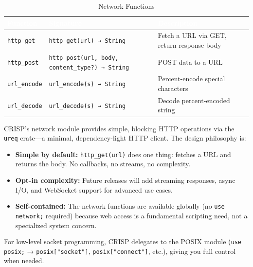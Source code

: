 \begin{table}[H]
\centering
{}
\caption{\textcolor{darkpurple}{Network Functions}}
\vspace{0.3em}
\begin{tabular}{@{}llp{8cm}@{}}
\toprule
\rowcolor{softvioletdark}
\textbf{\textcolor{white}{Function}} & \textbf{\textcolor{white}{Signature}} & \textbf{\textcolor{white}{Description}} \\
\midrule
\texttt{http\_get} & \texttt{http\_get(url) → String} & Fetch a URL via GET, return response body \\
\texttt{http\_post} & \texttt{http\_post(url, body, content\_type?) → String} & POST data to a URL \\
\texttt{url\_encode} & \texttt{url\_encode(s) → String} & Percent-encode special characters \\
\texttt{url\_decode} & \texttt{url\_decode(s) → String} & Decode percent-encoded string \\
\bottomrule
\end{tabular}
\end{table}

\vspace{1.5cm}
\begin{tcolorbox}[colback=lightlavender, colframe=softvioletdark, title=\textbf{\textcolor{darkpurple}{Design Note: HTTP Support}}, fonttitle=\bfseries, sharp corners]
CRISP's network module provides simple, blocking HTTP operations via the \texttt{ureq} crate—a minimal, dependency-light HTTP client. The design philosophy is:

\begin{itemize}
    \item \textbf{Simple by default:} \texttt{http\_get(url)} does one thing: fetches a URL and returns the body. No callbacks, no streams, no complexity.
    \item \textbf{Opt-in complexity:} Future releases will add streaming responses, async I/O, and WebSocket support for advanced use cases.
    \item \textbf{Self-contained:} The network functions are available globally (no \texttt{use network;} required) because web access is a fundamental scripting need, not a specialized system concern.
\end{itemize}

For low-level socket programming, CRISP delegates to the POSIX module (\texttt{use posix;} → \texttt{posix["socket"]}, \texttt{posix["connect"]}, etc.), giving you full control when needed.
\end{tcolorbox}
